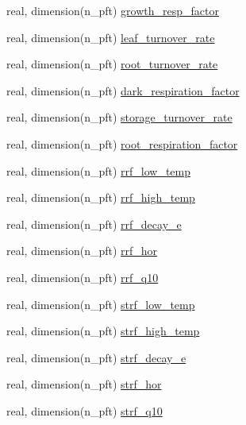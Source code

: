 \begin{DoxyCompactItemize}
\item 
real, dimension(n\+\_\+pft) \hyperlink{namespacepft__coms_ae299a7616ce4a71415041f39e6e55d6c}{growth\+\_\+resp\+\_\+factor}
\item 
real, dimension(n\+\_\+pft) \hyperlink{namespacepft__coms_a3c2cfe5a5095b3617d6ef0eda3088d07}{leaf\+\_\+turnover\+\_\+rate}
\item 
real, dimension(n\+\_\+pft) \hyperlink{namespacepft__coms_a99860b135721c9298c4a28c8eeaab425}{root\+\_\+turnover\+\_\+rate}
\item 
real, dimension(n\+\_\+pft) \hyperlink{namespacepft__coms_acd493e3e4371571956c651698a6462b9}{dark\+\_\+respiration\+\_\+factor}
\item 
real, dimension(n\+\_\+pft) \hyperlink{namespacepft__coms_ac6e0048b175e1bdd410e60c25eddd828}{storage\+\_\+turnover\+\_\+rate}
\item 
real, dimension(n\+\_\+pft) \hyperlink{namespacepft__coms_a3bc4fe17b80e40b1224d3e46d9699a66}{root\+\_\+respiration\+\_\+factor}
\item 
real, dimension(n\+\_\+pft) \hyperlink{namespacepft__coms_a87bba89213b158e2aed4dac23565b3d6}{rrf\+\_\+low\+\_\+temp}
\item 
real, dimension(n\+\_\+pft) \hyperlink{namespacepft__coms_ae05300b2ffecef7671154f099c69e0bb}{rrf\+\_\+high\+\_\+temp}
\item 
real, dimension(n\+\_\+pft) \hyperlink{namespacepft__coms_a2087ec09afb37705591b08017b2bcb27}{rrf\+\_\+decay\+\_\+e}
\item 
real, dimension(n\+\_\+pft) \hyperlink{namespacepft__coms_a5fc24fd1652202216904fe39f1a2f318}{rrf\+\_\+hor}
\item 
real, dimension(n\+\_\+pft) \hyperlink{namespacepft__coms_aadcb3d9b31b09de0ee92c5c0d549ce28}{rrf\+\_\+q10}
\item 
real, dimension(n\+\_\+pft) \hyperlink{namespacepft__coms_a1e68af5e117a86b34f515771b0aa4b37}{strf\+\_\+low\+\_\+temp}
\item 
real, dimension(n\+\_\+pft) \hyperlink{namespacepft__coms_a065e5f350ad9ac77d9a66c7486268fb8}{strf\+\_\+high\+\_\+temp}
\item 
real, dimension(n\+\_\+pft) \hyperlink{namespacepft__coms_a5cfdb0129f160897b6cc37536a67cfc5}{strf\+\_\+decay\+\_\+e}
\item 
real, dimension(n\+\_\+pft) \hyperlink{namespacepft__coms_a7ef86f21ed213453006c76ac60401a75}{strf\+\_\+hor}
\item 
real, dimension(n\+\_\+pft) \hyperlink{namespacepft__coms_ab74ac70bc631850f0b352ce40c565acb}{strf\+\_\+q10}

\end{DoxyCompactItemize}

